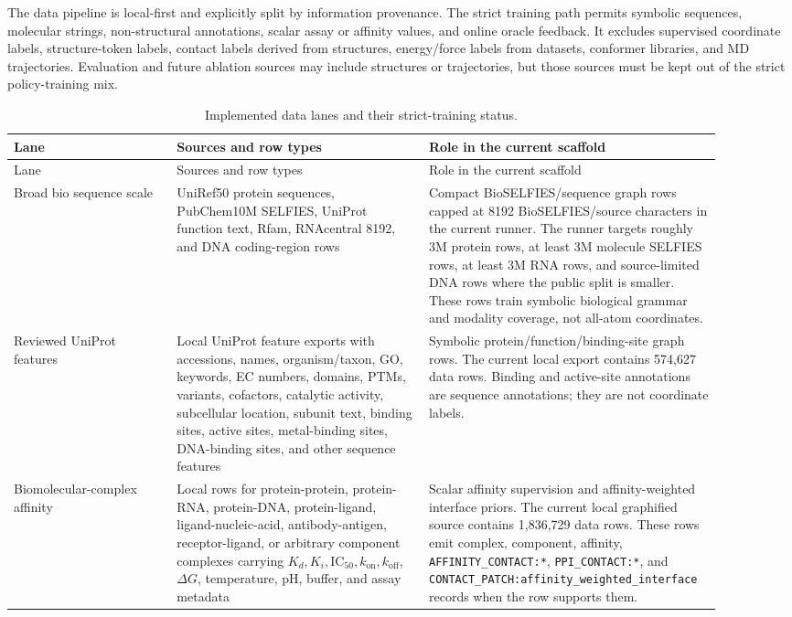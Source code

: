\documentclass[11pt]{article}
\begin{document}
The data pipeline is local-first and explicitly split by information provenance. The strict training path permits symbolic sequences, molecular strings, non-structural annotations, scalar assay or affinity values, and online oracle feedback. It excludes supervised coordinate labels, structure-token labels, contact labels derived from structures, energy/force labels from datasets, conformer libraries, and MD trajectories. Evaluation and future ablation sources may include structures or trajectories, but those sources must be kept out of the strict policy-training mix.

\begin{longtable}{p{0.22\linewidth}p{0.34\linewidth}p{0.34\linewidth}}
\caption{Implemented data lanes and their strict-training status.}\\
\toprule
Lane & Sources and row types & Role in the current scaffold\\
\midrule
\endfirsthead
\toprule
Lane & Sources and row types & Role in the current scaffold\\
\midrule
\endhead
Broad bio sequence scale & UniRef50 protein sequences, PubChem10M SELFIES, UniProt function text, Rfam, RNAcentral 8192, and DNA coding-region rows & Compact BioSELFIES/sequence graph rows capped at 8192 BioSELFIES/source characters in the current runner. The runner targets roughly 3M protein rows, at least 3M molecule SELFIES rows, at least 3M RNA rows, and source-limited DNA rows where the public split is smaller. These rows train symbolic biological grammar and modality coverage, not all-atom coordinates.\\
Reviewed UniProt features & Local UniProt feature exports with accessions, names, organism/taxon, GO, keywords, EC numbers, domains, PTMs, variants, cofactors, catalytic activity, subcellular location, subunit text, binding sites, active sites, metal-binding sites, DNA-binding sites, and other sequence features & Symbolic protein/function/binding-site graph rows. The current local export contains 574,627 data rows. Binding and active-site annotations are sequence annotations; they are not coordinate labels.\\
Biomolecular-complex affinity & Local rows for protein-protein, protein-RNA, protein-DNA, protein-ligand, ligand-nucleic-acid, antibody-antigen, receptor-ligand, or arbitrary component complexes carrying \(K_d,K_i,\mathrm{IC}_{50},k_{\mathrm{on}},k_{\mathrm{off}}\), \(\Delta G\), temperature, pH, buffer, and assay metadata & Scalar affinity supervision and affinity-weighted interface priors. The current local graphified source contains 1,836,729 data rows. These rows emit complex, component, affinity, \texttt{AFFINITY\_CONTACT:*}, \texttt{PPI\_CONTACT:*}, and \texttt{CONTACT\_PATCH:affinity\_weighted\_interface} records when the row supports them.\\

\end{longtable}
\end{document}
